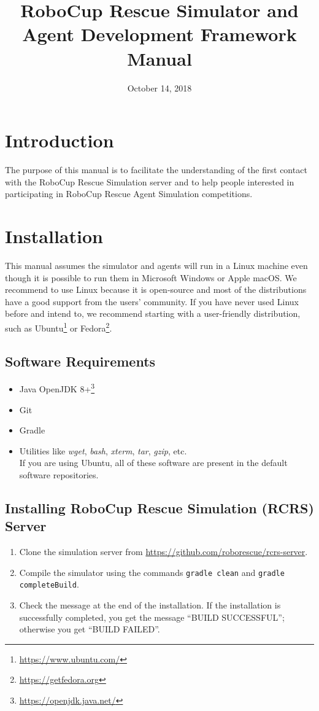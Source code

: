 \documentclass[a4paper]{article}
\begin{document}
\title{RoboCup Rescue Simulator and Agent Development Framework Manual}
\date{October 14, 2018}
\maketitle
\tableofcontents
\section{Introduction}
The purpose of this manual is to facilitate the understanding of the first contact with the RoboCup Rescue Simulation server and to help people interested in participating in RoboCup Rescue Agent Simulation competitions.
\section{Installation}
This manual assumes the simulator and agents will run in a Linux machine even though it is possible to run them in Microsoft Windows or Apple macOS. We recommend to use Linux because it is open-source and most of the distributions have a good support from the users' community. If you have never used Linux before and intend to, we recommend starting with a user-friendly distribution, such as Ubuntu\footnote{\url{https://www.ubuntu.com/}} or Fedora\footnote{\url{https://getfedora.org}}.
\subsection{Software Requirements}
\begin{itemize}
  \item Java OpenJDK 8+\footnote{\url{https://openjdk.java.net/}}
  \item Git
  \item Gradle
  \item Utilities like \emph{wget}, \emph{bash}, \emph{xterm}, \emph{tar}, \emph{gzip}, etc.\\
        If you are using Ubuntu, all of these software are present in the
        default software repositories.
\end{itemize}
\subsection{Installing RoboCup Rescue Simulation (RCRS) Server}
\begin{enumerate}
 \item Clone the simulation server from \url{https://github.com/roborescue/rcrs-server}.
 \item Compile the simulator using the commands \texttt{gradle clean} and \texttt{gradle completeBuild}.
 \item Check the message at the end of the installation.
       If the installation is successfully completed, you get the message ``BUILD SUCCESSFUL''; otherwise you get ``BUILD FAILED''.
\end{enumerate}
\end{document}
